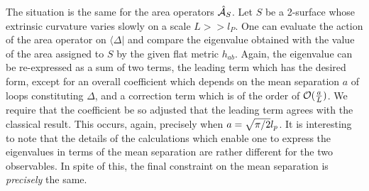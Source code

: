 The situation is the same for the area operators $\hat{\cal A}_S$. Let $S$ be
a 2-surface whose extrinsic curvature varies slowly on a scale $L >>l_P$. One
can evaluate the action of the area operator on $\langle \Delta |$ and compare
the eigenvalue obtained with the value of the area assigned to $S$ by the
given flat metric $h_{ab}$. Again, the eigenvalue can be re-expressed as a
sum of two terms, the leading term which has the desired form, except for an
overall coefficient which depends on the mean separation $a$ of loops
constituting $\Delta$, and a correction term which is of the order of
${\cal O}({a\over L})$. We require that the coefficient be so adjusted that
the leading term agrees with the classical result. This occurs, again,
precisely when $a = \sqrt{\pi/2}\- l_p$. It is interesting to note that the
details of the calculations which enable one to express the eigenvalues in
terms of the mean separation are rather different for the two observables. In
spite of this, the final constraint on the mean separation is {\it precisely}
the same.

